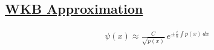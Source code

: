 \subsection*{\underline{WKB Approximation}}

\begin{align*}
	\psi(x) \approx \frac{C}{\sqrt{p(x)}} \, e^{\pm \frac{i}{\hbar} \int p(x)\, dx}
\end{align*}

